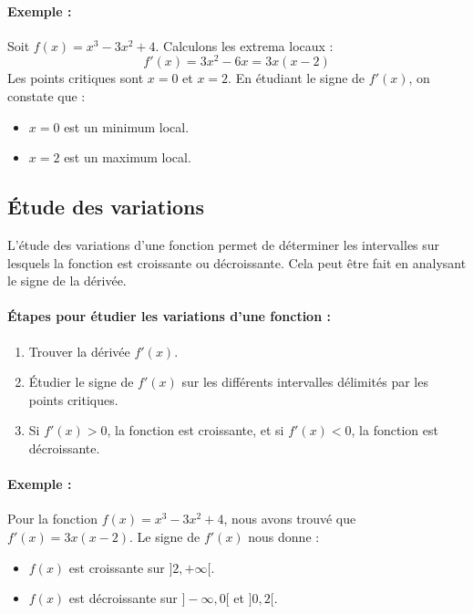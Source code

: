 \documentclass{article}
\begin{document}
	\paragraph{Exemple :} Soit \( f(x) = x^3 - 3x^2 + 4 \). Calculons les extrema locaux :
	\[
	f'(x) = 3x^2 - 6x = 3x(x-2)
	\]
	Les points critiques sont \( x = 0 \) et \( x = 2 \). En étudiant le signe de \( f'(x) \), on constate que :
	\begin{itemize}
		\item \( x = 0 \) est un minimum local.
		\item \( x = 2 \) est un maximum local.
	\end{itemize}
	
	\subsection{Étude des variations}
	
	L'étude des variations d'une fonction permet de déterminer les intervalles sur lesquels la fonction est croissante ou décroissante. Cela peut être fait en analysant le signe de la dérivée.
	
	\paragraph{Étapes pour étudier les variations d'une fonction :}
	\begin{enumerate}
		\item Trouver la dérivée \( f'(x) \).
		\item Étudier le signe de \( f'(x) \) sur les différents intervalles délimités par les points critiques.
		\item Si \( f'(x) > 0 \), la fonction est croissante, et si \( f'(x) < 0 \), la fonction est décroissante.
	\end{enumerate}
	
	\paragraph{Exemple :} Pour la fonction \( f(x) = x^3 - 3x^2 + 4 \), nous avons trouvé que \( f'(x) = 3x(x-2) \). Le signe de \( f'(x) \) nous donne :
	\begin{itemize}
		\item \( f(x) \) est croissante sur \( ]2, +\infty[ \).
		\item \( f(x) \) est décroissante sur \( ]-\infty, 0[ \) et \( ]0, 2[ \).
	\end{itemize}
	
\end{document}
